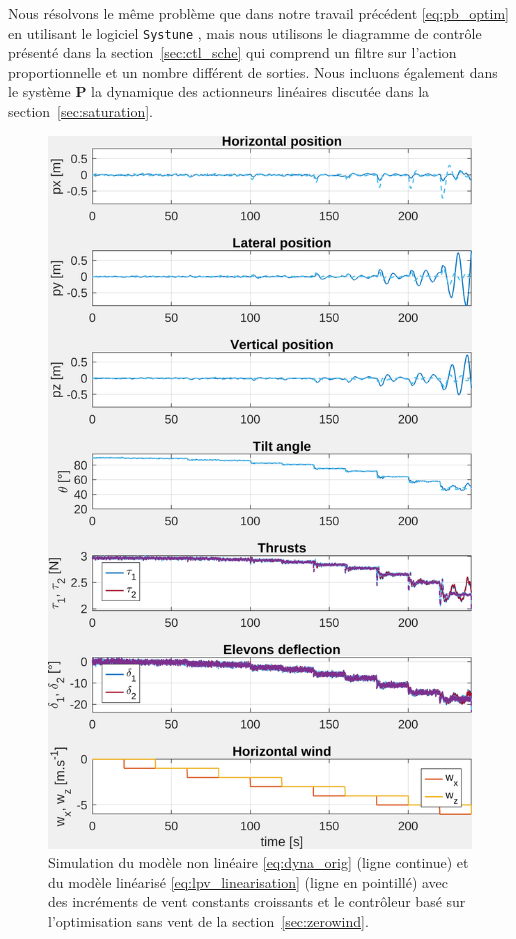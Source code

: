 Nous résolvons le même problème que dans notre travail précédent \ref{eq:pb_optim} en utilisant le logiciel {\tt Systune} \cite{1576856}, mais nous utilisons le diagramme de contrôle présenté dans la section~\ref{sec:ctl_sche} qui comprend un filtre sur l'action proportionnelle et un nombre différent de sorties. Nous incluons également dans le système $\boldsymbol{P}$ la dynamique des actionneurs linéaires discutée dans la section~\ref{sec:saturation}.
\begin{figure}[ht!]
    \centering
    \includegraphics[trim=0cm 0cm 0cm 0cm,clip,width=0.6\columnwidth]{figures/sim_systune_zero_wind.png}
    \caption{Simulation du modèle non linéaire \eqref{eq:dyna_orig} (ligne continue) et du modèle linéarisé \eqref{eq:lpv_linearisation} (ligne en pointillé) avec des incréments de vent constants croissants et le contrôleur basé sur l'optimisation sans vent de la section~\ref{sec:zerowind}.}
    \label{fig:SimSytuneStruct_zero}
\end{figure}

